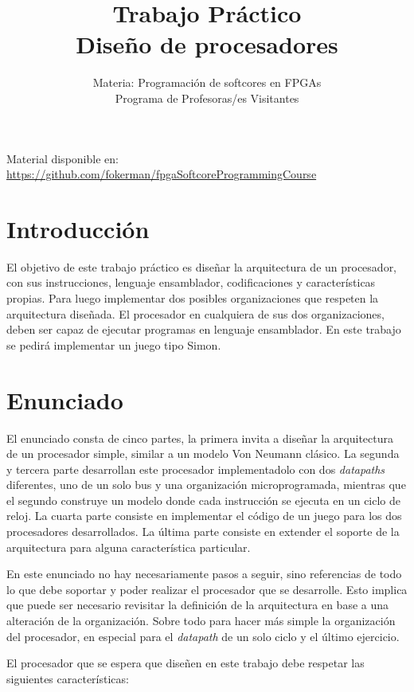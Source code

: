 \documentclass[a4paper,11pt]{article}
\title{Trabajo Práctico\\ 
\large{Diseño de procesadores}}
\author{Materia: Programación de softcores en FPGAs\\
Programa de Profesoras/es Visitantes}
\date{}
\begin{document}
\maketitle

\begin{center}
    \scriptsize Material disponible en: \url{https://github.com/fokerman/fpgaSoftcoreProgrammingCourse}
\end{center}

\section{Introducción}

El objetivo de este trabajo práctico es diseñar la arquitectura de un procesador, con sus instrucciones, lenguaje ensamblador, codificaciones y características propias.
Para luego implementar dos posibles organizaciones que respeten la arquitectura diseñada.
El procesador en cualquiera de sus dos organizaciones, deben ser capaz de ejecutar programas en lenguaje ensamblador.
En este trabajo se pedirá implementar un juego tipo Simon.

\section{Enunciado}

El enunciado consta de cinco partes, la primera invita a diseñar la arquitectura de un procesador simple, similar a un modelo Von Neumann clásico.
La segunda y tercera parte desarrollan este procesador implementadolo con dos \emph{datapaths} diferentes, uno de un solo bus y una organización microprogramada,
mientras que el segundo construye un modelo donde cada instrucción se ejecuta en un ciclo de reloj.
La cuarta parte consiste en implementar el código de un juego para los dos procesadores desarrollados.
La última parte consiste en extender el soporte de la arquitectura para alguna característica particular.

En este enunciado no hay necesariamente pasos a seguir, sino referencias de todo lo que debe soportar y poder realizar el procesador que se desarrolle.
Esto implica que puede ser necesario revisitar la definición de la arquitectura en base a una alteración de la organización.
Sobre todo para hacer más simple la organización del procesador, en especial para el \emph{datapath} de un solo ciclo y el último ejercicio.

El procesador que se espera que diseñen en este trabajo debe respetar las siguientes características:
\end{document}

